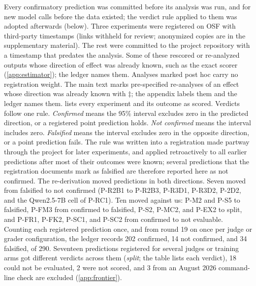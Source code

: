 Every confirmatory prediction was committed before its analysis was run, and for new model calls before the data existed; the verdict rule applied to them was adopted afterwards (below). Three experiments were registered on OSF with third-party timestamps\osf{} (links withheld for review; anonymized copies are in the supplementary material). The rest were committed to the project repository with a timestamp that predates the analysis\pre. Some of these rescored or re-analyzed outputs whose direction of effect was already known, such as the exact scorer (\cref{app:estimator}); the ledger names them. Analyses marked post hoc\ph{} carry no registration weight. The main text marks pre-specified re-analyses of an effect whose direction was already known with $\ddagger$; the appendix labels them \pre{} and the ledger names them.  lists every experiment and its outcome as scored. Verdicts follow one rule. \emph{Confirmed} means the 95\% interval excludes zero in the predicted direction, or a registered point prediction holds. \emph{Not confirmed} means the interval includes zero. \emph{Falsified} means the interval excludes zero in the opposite direction, or a point prediction fails. The rule was written into a registration made partway through the project for later experiments, and applied retroactively to all earlier predictions after most of their outcomes were known; several predictions that the registration documents mark as falsified are therefore reported here as not confirmed. The re-derivation moved predictions in both directions. Seven moved from falsified to not confirmed (P-R2B1 to P-R2B3, P-R3D1, P-R3D2, P-2D2, and the Qwen2.5-7B cell of P-RC1). Ten moved against us: P-M2 and P-S5 to falsified, P-FM3 from confirmed to falsified, P-S2, P-MC2, and P-EX2 to split, and P-FR1, P-FK2, P-SC1, and P-SC2 from confirmed to not evaluable. Counting each registered prediction once, and from round 19 on once per judge or grader configuration, the ledger records 202 confirmed, 14 not confirmed, and 34 falsified, of 290. Seventeen predictions registered for several judges or training arms got different verdicts across them (\emph{split}; the table lists each verdict), 18 could not be evaluated, 2 were not scored, and 3 from an August 2026 command-line check are excluded (\cref{app:frontier}).

